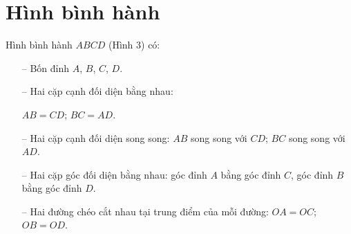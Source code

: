 \documentclass[11pt]{article}
\begin{document}
\section{Hình bình hành}
\begin{paracol}{2}
Hình bình hành \(ABCD\) (Hình 3) có:
\begin{itemize}
  \item[--] Bốn đỉnh \(A\), \(B\), \(C\), \(D\).
  \item[--] Hai cặp cạnh đối diện bằng nhau:
  
  \(AB = CD\); \(BC = AD\).
  \item[--] Hai cặp cạnh đối diện song song: \(AB\) song song với \(CD\); \(BC\) song song với \(AD\).
  \item[--] Hai cặp góc đối diện bằng nhau: góc đỉnh \(A\) bằng góc đỉnh \(C\), góc đỉnh \(B\) bằng góc đỉnh \(D\).
  \item[--] Hai đường chéo cắt nhau tại trung điểm của mỗi đường: \(OA = OC\); \(OB = OD\).
\end{itemize}
\switchcolumn
\centering
{}
\vspace{-\baselineskip}
\end{paracol}
\end{document}
